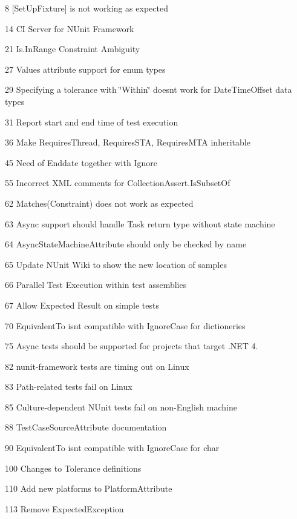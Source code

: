 \begin{DoxyItemize}
\item 8 [Set\+Up\+Fixture] is not working as expected
\item 14 CI Server for N\+Unit Framework
\item 21 Is.\+In\+Range Constraint Ambiguity
\item 27 Values attribute support for enum types
\item 29 Specifying a tolerance with \char`\"{}\+Within\char`\"{} doesn\textquotesingle{}t work for Date\+Time\+Offset data types
\item 31 Report start and end time of test execution
\item 36 Make Requires\+Thread, Requires\+S\+TA, Requires\+M\+TA inheritable
\item 45 Need of Enddate together with Ignore
\item 55 Incorrect X\+ML comments for Collection\+Assert.\+Is\+Subset\+Of
\item 62 Matches(\+Constraint) does not work as expected
\item 63 Async support should handle Task return type without state machine
\item 64 Async\+State\+Machine\+Attribute should only be checked by name
\item 65 Update N\+Unit Wiki to show the new location of samples
\item 66 Parallel Test Execution within test assemblies
\item 67 Allow Expected Result on simple tests
\item 70 Equivalent\+To isn\textquotesingle{}t compatible with Ignore\+Case for dictioneries
\item 75 Async tests should be supported for projects that target .N\+ET 4.
\item 82 nunit-\/framework tests are timing out on Linux
\item 83 Path-\/related tests fail on Linux
\item 85 Culture-\/dependent N\+Unit tests fail on non-\/\+English machine
\item 88 Test\+Case\+Source\+Attribute documentation
\item 90 Equivalent\+To isn\textquotesingle{}t compatible with Ignore\+Case for char
\item 100 Changes to Tolerance definitions
\item 110 Add new platforms to Platform\+Attribute
\item 113 Remove Expected\+Exception

\end{DoxyItemize}
